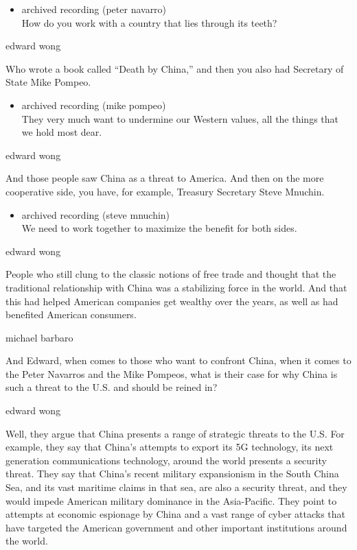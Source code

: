 \begin{itemize}
\tightlist
\item
  archived recording (peter navarro)\\
  How do you work with a country that lies through its teeth?
\end{itemize}

edward wong

Who wrote a book called ``Death by China,'' and then you also had
Secretary of State Mike Pompeo.

\begin{itemize}
\tightlist
\item
  archived recording (mike pompeo)\\
  They very much want to undermine our Western values, all the things
  that we hold most dear.
\end{itemize}

edward wong

And those people saw China as a threat to America. And then on the more
cooperative side, you have, for example, Treasury Secretary Steve
Mnuchin.

\begin{itemize}
\tightlist
\item
  archived recording (steve mnuchin)\\
  We need to work together to maximize the benefit for both sides.
\end{itemize}

edward wong

People who still clung to the classic notions of free trade and thought
that the traditional relationship with China was a stabilizing force in
the world. And that this had helped American companies get wealthy over
the years, as well as had benefited American consumers.

michael barbaro

And Edward, when comes to those who want to confront China, when it
comes to the Peter Navarros and the Mike Pompeos, what is their case for
why China is such a threat to the U.S. and should be reined in?

edward wong

Well, they argue that China presents a range of strategic threats to the
U.S. For example, they say that China's attempts to export its 5G
technology, its next generation communications technology, around the
world presents a security threat. They say that China's recent military
expansionism in the South China Sea, and its vast maritime claims in
that sea, are also a security threat, and they would impede American
military dominance in the Asia-Pacific. They point to attempts at
economic espionage by China and a vast range of cyber attacks that have
targeted the American government and other important institutions around
the world.

